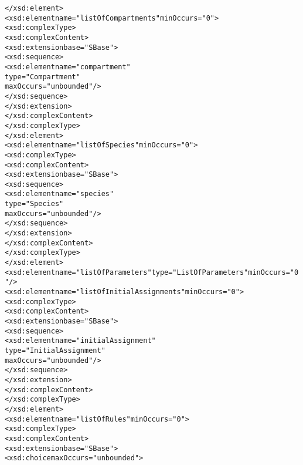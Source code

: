 \begin{alltt}
                    </xsd:element>
                    <xsd:element name="listOfCompartments" minOccurs="0">
                        <xsd:complexType>
                            <xsd:complexContent>
                                <xsd:extension base="SBase">
                                    <xsd:sequence>
                                        <xsd:element name="compartment" 
                                                     type="Compartment" 
                                                     maxOccurs="unbounded"/>
                                    </xsd:sequence>
                                </xsd:extension>
                            </xsd:complexContent>
                        </xsd:complexType>
                    </xsd:element>
                    <xsd:element name="listOfSpecies" minOccurs="0">
                        <xsd:complexType>
                            <xsd:complexContent>
                                <xsd:extension base="SBase">
                                    <xsd:sequence>
                                        <xsd:element name="species" 
                                                     type="Species" 
                                                     maxOccurs="unbounded"/>
                                    </xsd:sequence>
                                </xsd:extension>
                            </xsd:complexContent>
                        </xsd:complexType>
                    </xsd:element>
                    <xsd:element name="listOfParameters" type="ListOfParameters" minOccurs="0"/>
                    <xsd:element name="listOfInitialAssignments" minOccurs="0">
                        <xsd:complexType>
                            <xsd:complexContent>
                                <xsd:extension base="SBase">
                                    <xsd:sequence>
                                        <xsd:element name="initialAssignment" 
                                                     type="InitialAssignment" 
                                                     maxOccurs="unbounded"/>
                                    </xsd:sequence>
                                </xsd:extension>
                            </xsd:complexContent>
                        </xsd:complexType>
                    </xsd:element>
                    <xsd:element name="listOfRules" minOccurs="0">
                        <xsd:complexType>
                            <xsd:complexContent>
                                <xsd:extension base="SBase">
                                    <xsd:choice maxOccurs="unbounded">

\end{alltt}
